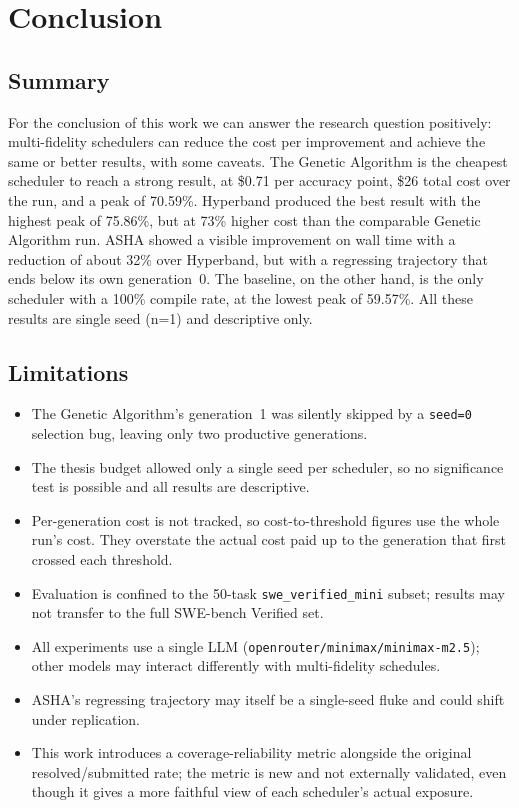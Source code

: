 \chapter{Conclusion}
\label{chap:conclusion}

\section{Summary}

For the conclusion of this work we can answer the research question
positively: multi-fidelity schedulers can reduce the cost per
improvement and achieve the same or better results, with some caveats.
The Genetic Algorithm is the cheapest scheduler to reach a strong
result, at \$0.71 per accuracy point, \$26 total cost over the run,
and a peak of 70.59\%. Hyperband produced the best result with the
highest peak of 75.86\%, but at 73\% higher cost than the comparable
Genetic Algorithm run. ASHA showed a visible improvement on wall time
with a reduction of about 32\% over Hyperband, but with a regressing
trajectory that ends below its own generation~0. The baseline, on the
other hand, is the only scheduler with a 100\% compile rate, at the
lowest peak of 59.57\%. All these results are single seed (n=1) and
descriptive only.

\section{Limitations}

\begin{itemize}
  \item The Genetic Algorithm's generation~1 was silently skipped by a
    \texttt{seed=0} selection bug, leaving only two productive
    generations.
  \item The thesis budget allowed only a single seed per scheduler, so
    no significance test is possible and all results are descriptive.
  \item Per-generation cost is not tracked, so cost-to-threshold
    figures use the whole run's cost. They overstate the actual cost
    paid up to the generation that first crossed each threshold.
  \item Evaluation is confined to the 50-task
    \texttt{swe\_verified\_mini} subset; results may not transfer to
    the full SWE-bench Verified set.
  \item All experiments use a single LLM
    (\texttt{openrouter/minimax/minimax-m2.5}); other models may
    interact differently with multi-fidelity schedules.
  \item ASHA's regressing trajectory may itself be a single-seed fluke
    and could shift under replication.
  \item This work introduces a coverage-reliability metric alongside
    the original resolved/submitted rate; the metric is new and not
    externally validated, even though it gives a more faithful view of
    each scheduler's actual exposure.
\end{itemize}

